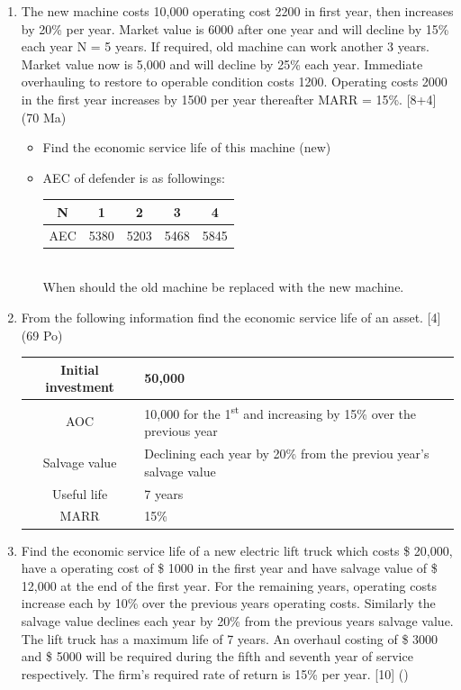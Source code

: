 \documentclass[12pt]{article}
\newcommand{\super}[1]{\textsuperscript{#1}}
\begin{document}
\begin{enumerate}
			\item The new machine costs 10,000 operating cost 2200 in first year, then increases by 20\% per year. Market value is 6000 after one year and will decline by 15\% each year N = 5 years. If required, old machine can work another 3 years. Market value now is 5,000 and will decline by 25\% each year. Immediate overhauling to restore to operable condition costs 1200. Operating costs 2000 in the first year increases by 1500 per year thereafter MARR = 15\%. \hfill [8+4] (70 Ma)
			\begin{itemize}[noitemsep, topsep=0pt]
				\item Find the economic service life of this machine (new)
				\item AEC of defender is as followings:\\
				\begin{tabular}{|c|c|c|c|c|}
					\hline
					N & 1 & 2 & 3 & 4 \\ \hline
					AEC & 5380 & 5203 & 5468 & 5845 \\ \hline
				\end{tabular}\\
				When should the old machine be replaced with the new machine.
			\end{itemize}

			\item From the following information find the economic service life of an asset. \hfill [4] (69 Po) \\
			\begin{tabular}{|c|l|}
				\hline
				Initial investment & 50,000 \\ \hline
				AOC & 10,000 for the 1\super{st} and increasing by 15\% over the previous year \\ \hline
				Salvage value & Declining each year by 20\% from the previou year's salvage value \\ \hline
				Useful life & 7 years \\ \hline
				MARR & 15\% \\ \hline
			\end{tabular}

			\item Find the economic service life of a new electric lift truck which costs \$ 20,000, have a operating cost of \$ 1000 in the first year and have salvage value of \$ 12,000 at the end of the first year. For the remaining years,  operating costs increase each by 10\% over the previous years operating costs. Similarly the salvage value declines each year by 20\% from the previous years salvage value. The lift truck has a maximum life of 7 years. An overhaul costing of \$ 3000 and \$ 5000 will be required during the fifth and seventh year of service respectively. The firm's required rate of return is 15\% per year. \hfill [10] ()


\end{enumerate}
\end{document}
